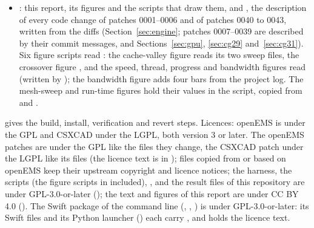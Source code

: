 \begin{itemize}
  (Section~\ref{sec:method}) were run with it.
\item {}: this report, its figures and the scripts that draw them, and , the
  description of every code change of patches 0001--0006 and of patches 0040 to 0043, written from the diffs
  (Section~\ref{sec:engine}; patches 0007--0039 are described by their commit messages,  and
  Sections~\ref{sec:gpu}, \ref{sec:cg29} and~\ref{sec:cg31}). Six figure scripts read
  : the cache-valley figure reads its two sweep files, the crossover figure
  , and the speed, thread, progress and bandwidth
  figures read  (written by ); the bandwidth figure adds four bars
  from the project log. The mesh-sweep and run-time figures hold their values in the script, copied from
   and .
\end{itemize}
 gives the build, install, verification and revert steps. Licences: openEMS is under the GPL and CSXCAD
under the LGPL, both version 3 or later. The openEMS patches are under the GPL like the files they change, the CSXCAD
patch under the LGPL like its files (the licence text is in ); files copied from or based on
openEMS keep their upstream copyright and licence notices; the harness, the scripts (the figure scripts in
 included), ,  and the result files of this
repository are under GPL-3.0-or-later (); the text and figures of this report are under CC BY 4.0
(). The Swift package of the command line (, ,
) is under GPL-3.0-or-later: its Swift files and its Python launcher () each carry
, and  holds the licence text.

